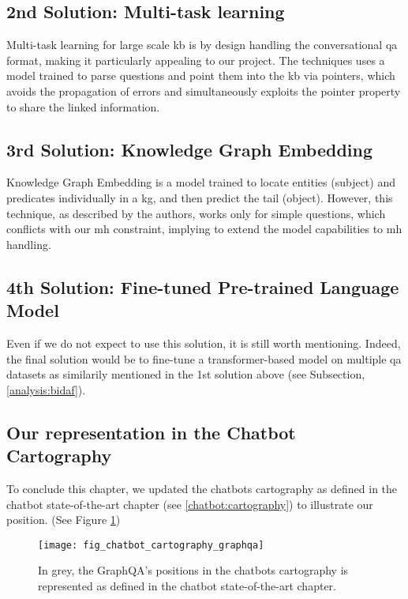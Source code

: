 \subsection{2nd Solution: Multi-task learning}
Multi-task learning for large scale \gls{kb} \autocite{paper:2019arXiv191005069S} is by design handling the conversational \gls{qa} format, making it particularly appealing to our project. The techniques uses a model trained to parse questions and point them into the \gls{kb} via pointers, which avoids the propagation of errors and simultaneously exploits the pointer property to share the linked information.

\subsection{3rd Solution: Knowledge Graph Embedding}
Knowledge Graph Embedding \autocite{paper:2019arXiv191102168W} is a model trained to locate entities (subject) and predicates individually in a \gls{kg}, and then predict the tail (object). However, this technique, as described by the authors, works only for simple questions, which conflicts with our \gls{mh} constraint, implying to extend the model capabilities to \gls{mh} handling. 

\subsection{4th Solution: Fine-tuned Pre-trained Language Model}
Even if we do not expect to use this solution, it is still worth mentioning. Indeed, the final solution would be to fine-tune a transformer-based model on multiple \gls{qa} datasets as similarily mentioned in the 1st solution above (see Subsection, \ref{analysis:bidaf}).


\subsection{Our representation in the Chatbot Cartography}
To conclude this chapter, we updated the chatbots cartography as defined in the chatbot state-of-the-art chapter (see \ref{chatbot:cartography}) to illustrate our position. (See Figure \ref{fig:fig_chatbot_cartography_graphqa})

\begin{figure}[H]
    \centering
    \texttt{[image: fig\_chatbot\_cartography\_graphqa]}
    \caption{In grey, the GraphQA's positions in the chatbots cartography is represented as defined in the chatbot state-of-the-art chapter.}
    \label{fig:fig_chatbot_cartography_graphqa}
\end{figure}

